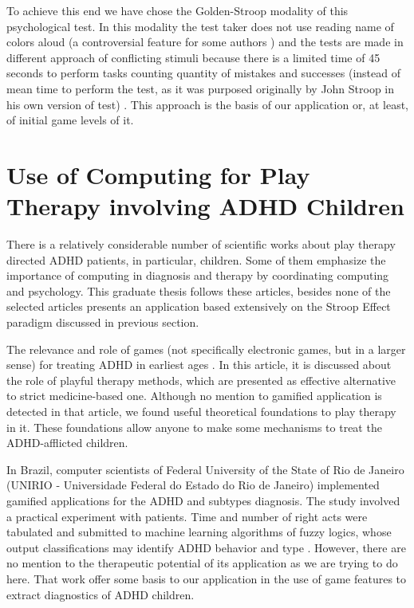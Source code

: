 To achieve this end we have chose the Golden-Stroop modality of this psychological test. In this modality the test taker does not use reading name of colors aloud (a controversial feature for some authors \citep{macleod}) and the tests are made in different approach of conflicting stimuli because there is a limited time of 45 seconds to perform tasks counting quantity of mistakes and successes (instead of mean time to perform the test, as it was purposed originally by John Stroop in his own version of test) \citep{goldencj}. This approach is the basis of our application or, at least, of initial game levels of it.



\section{Use of Computing for Play Therapy involving ADHD Children}



There is a relatively considerable number of scientific works about play therapy directed ADHD patients, in particular, children. Some of them emphasize the importance of computing in diagnosis and therapy by coordinating computing and psychology. This graduate thesis follows these articles, besides none of the selected articles presents an application based extensively on the Stroop Effect paradigm discussed in previous section. 



The relevance and role of games (not specifically electronic games, but in a larger sense) for treating ADHD in earliest ages \citep{Psychoanalytic}. In this article, it is discussed about the role of playful therapy methods, which are presented as effective alternative to strict medicine-based one. Although no mention to gamified application is detected in that article, we found useful theoretical foundations to play therapy in it. These foundations allow anyone to make some mechanisms to treat the ADHD-afflicted children.



In Brazil, computer scientists of Federal University of the State of Rio de Janeiro (UNIRIO - Universidade Federal do Estado do Rio de Janeiro) implemented gamified applications for the ADHD and subtypes diagnosis. The study involved a practical experiment with patients. Time and number of right acts were tabulated and submitted to machine learning algorithms of fuzzy logics, whose output classifications may identify ADHD behavior  and type \citep{brasileiros}. However, there are no mention to the therapeutic potential of its application as we are trying to do here. That work offer some basis to our application in the use of game features to extract diagnostics of ADHD children.



